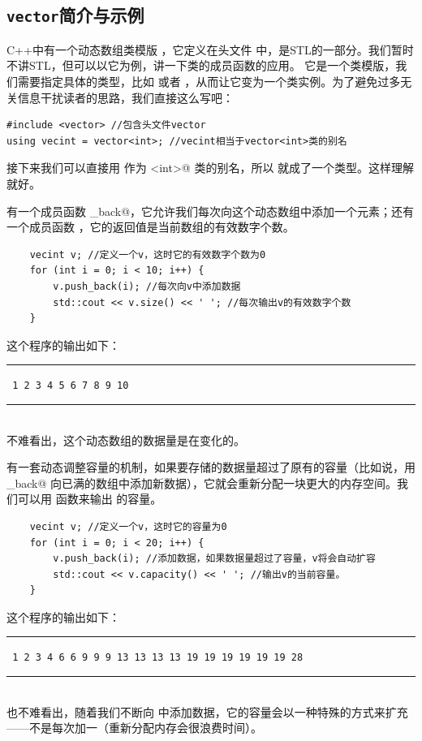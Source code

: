 \subsection*{\texttt{vector}简介与示例}
C++中有一个动态数组类模版 \lstinline@vector@，它定义在头文件 \lstinline@vector@ 中，是STL的一部分。我们暂时不讲STL，但可以以它为例，讲一下类的成员函数的应用。
它是一个类模版，我们需要指定具体的类型，比如 \lstinline@int@ 或者 \lstinline@double@，从而让它变为一个类实例。为了避免过多无关信息干扰读者的思路，我们直接这么写吧：
\begin{lstlisting}
#include <vector> //包含头文件vector
using vecint = vector<int>; //vecint相当于vector<int>类的别名
\end{lstlisting}
接下来我们可以直接用 \lstinline@vecint@ 作为 \lstinline@vector<int>@ 类的别名，所以 \lstinline@vecint@ 就成了一个类型。这样理解就好。\par
\lstinline@vecint@ 有一个成员函数 \lstinline@push_back@，它允许我们每次向这个动态数组中添加一个元素；还有一个成员函数 \lstinline@size@，它的返回值是当前数组的有效数字个数。
\begin{lstlisting}
    vecint v; //定义一个v，这时它的有效数字个数为0
    for (int i = 0; i < 10; i++) {
        v.push_back(i); //每次向v中添加数据
        std::cout << v.size() << ' '; //每次输出v的有效数字个数
    }
\end{lstlisting}
这个程序的输出如下：\\\noindent\rule{\linewidth}{.2pt}\texttt{
1 2 3 4 5 6 7 8 9 10
}\\\noindent\rule{\linewidth}{.2pt}\\
不难看出，这个动态数组的数据量是在变化的。\par
\lstinline@vecint@ 有一套动态调整容量的机制，如果要存储的数据量超过了原有的容量（比如说，用 \lstinline@push_back@ 向已满的数组中添加新数据），它就会重新分配一块更大的内存空间。我们可以用 \lstinline@capacity@ 函数来输出 \lstinline@v@ 的容量。
\begin{lstlisting}
    vecint v; //定义一个v，这时它的容量为0
    for (int i = 0; i < 20; i++) {
        v.push_back(i); //添加数据，如果数据量超过了容量，v将会自动扩容
        std::cout << v.capacity() << ' '; //输出v的当前容量。
    }
\end{lstlisting}
这个程序的输出如下：\\\noindent\rule{\linewidth}{.2pt}\texttt{
1 2 3 4 6 6 9 9 9 13 13 13 13 19 19 19 19 19 19 28
}\\\noindent\rule{\linewidth}{.2pt}\\
也不难看出，随着我们不断向 \lstinline@v@ 中添加数据，它的容量会以一种特殊的方式来扩充——不是每次加一（重新分配内存会很浪费时间）。\par
